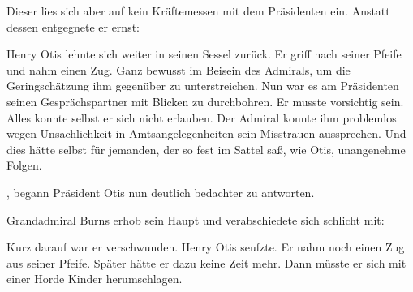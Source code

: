 \par

Dieser lies sich aber auf kein Kräftemessen mit dem Präsidenten ein. Anstatt dessen entgegnete er ernst: 

\par

Henry Otis lehnte sich weiter in seinen Sessel zurück. Er griff nach seiner Pfeife und nahm einen Zug. Ganz bewusst im Beisein des Admirals, um die Geringschätzung ihm gegenüber zu unterstreichen. Nun war es am Präsidenten seinen Gesprächspartner mit Blicken zu durchbohren. Er musste vorsichtig sein. Alles konnte selbst er sich nicht erlauben. Der Admiral konnte ihm problemlos wegen Unsachlichkeit in Amtsangelegenheiten sein Misstrauen aussprechen. Und dies hätte selbst für jemanden, der so fest im Sattel saß, wie Otis, unangenehme Folgen.

\par

, begann Präsident Otis nun deutlich bedachter zu antworten. 

\par

Grandadmiral Burns erhob sein Haupt und verabschiedete sich schlicht mit: 

\par

Kurz darauf war er verschwunden. Henry Otis seufzte. Er nahm noch einen Zug aus seiner Pfeife. Später hätte er dazu keine Zeit mehr. Dann müsste er sich mit einer Horde Kinder herumschlagen.
